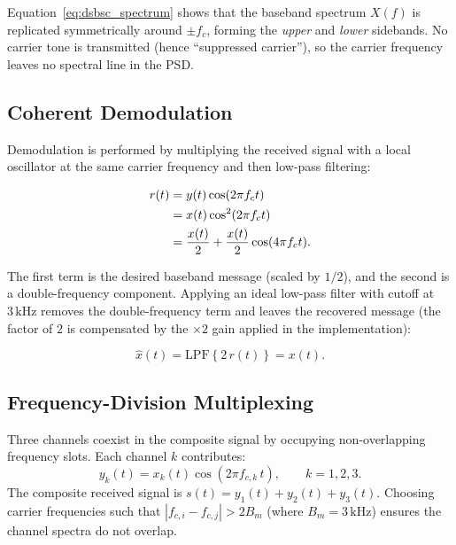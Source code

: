 \documentclass[12pt, a4paper]{article}
\begin{document}
Equation~\eqref{eq:dsbsc_spectrum} shows that the baseband spectrum $X(f)$ is
replicated symmetrically around $\pm f_c$, forming the \emph{upper} and
\emph{lower} sidebands. No carrier tone is transmitted (hence ``suppressed
carrier''), so the carrier frequency leaves no spectral line in the PSD.

\subsection{Coherent Demodulation}

Demodulation is performed by multiplying the received signal with a local
oscillator at the same carrier frequency and then low-pass filtering:

\begin{align}
    r(t) &= y(t)\cos(2\pi f_c t) \notag\\
         &= x(t)\cos^2(2\pi f_c t) \notag\\
         &= \frac{x(t)}{2} + \frac{x(t)}{2}\cos(4\pi f_c t).
    \label{eq:demod}
\end{align}

The first term is the desired baseband message (scaled by $1/2$), and the
second is a double-frequency component. Applying an ideal low-pass filter
with cutoff at $3\,\text{kHz}$ removes the double-frequency term and leaves
the recovered message (the factor of $2$ is compensated by the $\times 2$
gain applied in the implementation):

\begin{equation}
    \hat{x}(t) = \text{LPF}\!\left\{2\,r(t)\right\} = x(t).
    \label{eq:recovered}
\end{equation}

\subsection{Frequency-Division Multiplexing}

Three channels coexist in the composite signal by occupying non-overlapping
frequency slots. Each channel $k$ contributes:
\begin{equation}
    y_k(t) = x_k(t)\cos(2\pi f_{c,k}\,t), \qquad k=1,2,3.
\end{equation}
The composite received signal is $s(t)=y_1(t)+y_2(t)+y_3(t)$. Choosing
carrier frequencies such that $|f_{c,i}-f_{c,j}|>2B_m$ (where $B_m=3\,\text{kHz}$)
ensures the channel spectra do not overlap.

\end{document}
